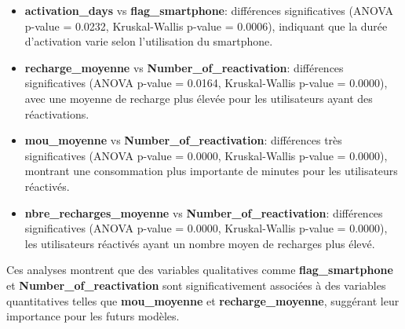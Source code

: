 \begin{itemize}
    \item \textbf{activation\_days} vs \textbf{flag\_smartphone}: différences significatives (ANOVA p-value = 0.0232, Kruskal-Wallis p-value = 0.0006), indiquant que la durée d'activation varie selon l'utilisation du smartphone.
    \item \textbf{recharge\_moyenne} vs \textbf{Number\_of\_reactivation}: différences significatives (ANOVA p-value = 0.0164, Kruskal-Wallis p-value = 0.0000), avec une moyenne de recharge plus élevée pour les utilisateurs ayant des réactivations.
    \item \textbf{mou\_moyenne} vs \textbf{Number\_of\_reactivation}: différences très significatives (ANOVA p-value = 0.0000, Kruskal-Wallis p-value = 0.0000), montrant une consommation plus importante de minutes pour les utilisateurs réactivés.
    \item \textbf{nbre\_recharges\_moyenne} vs \textbf{Number\_of\_reactivation}: différences significatives (ANOVA p-value = 0.0000, Kruskal-Wallis p-value = 0.0000), les utilisateurs réactivés ayant un nombre moyen de recharges plus élevé.
\end{itemize}

Ces analyses montrent que des variables qualitatives comme \textbf{flag\_smartphone} et \textbf{Number\_of\_reactivation} sont significativement associées à des variables quantitatives telles que \textbf{mou\_moyenne} et \textbf{recharge\_moyenne}, suggérant leur importance pour les futurs modèles.






